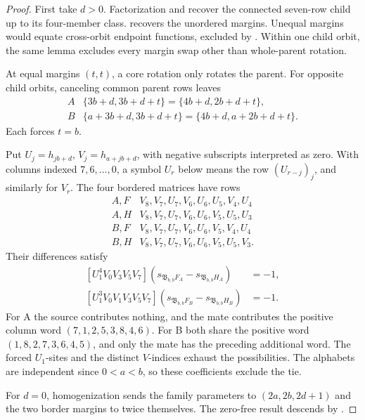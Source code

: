 \documentclass[11pt,a4paper]{amsart}
\numberwithin{equation}{section}
\theoremstyle{plain}
\theoremstyle{definition}
\newcommand{\B}{\mathfrak B}
\begin{document}
\begin{proof}
First take \(d>0\).  Factorization and 
recover the connected seven-row child up to its four-member class.
 recovers the unordered margins.  Unequal margins
would equate cross-orbit endpoint functions, excluded by
.  Within one child orbit, the same
lemma excludes every margin swap other than whole-parent rotation.

At equal margins \((t,t)\), a core rotation only rotates the parent.
For opposite child orbits, canceling common parent rows leaves
\begin{equation}\label{eq:ten-negative-border-rows}
 \begin{array}{c|c}
 A&\{3b+d,3b+d+t\}=\{4b+d,2b+d+t\},\\
 B&\{a+3b+d,3b+d+t\}=\{4b+d,a+2b+d+t\}.
 \end{array}
\end{equation}
Each forces \(t=b\).

Put \(U_j=h_{jb+d}\), \(V_j=h_{a+jb+d}\), with negative
subscripts interpreted as zero.  With columns indexed \(7,6,\ldots,0\),
a symbol \(U_r\) below means the row \((U_{r-j})_j\), and similarly
for \(V_r\).  The four bordered matrices have rows
\begin{equation}\label{eq:ten-negative-border-matrices}
 \begin{array}{c|l}
 A,F&V_8,V_7,U_7,V_6,U_6,U_5,V_4,U_4\\
 A,H&V_8,V_7,U_7,V_6,U_6,V_5,U_5,U_3\\
 B,F&V_8,V_7,U_7,V_6,U_6,V_5,V_4,U_4\\
 B,H&V_8,V_7,U_7,V_6,U_6,V_5,U_5,V_3.
 \end{array}
\end{equation}
Their differences satisfy
\begin{equation}\label{eq:ten-negative-border-separators}
 \begin{aligned}
 [U_1^4V_0V_3V_5V_7]
 (s_{\B_{b,b}F_A}-s_{\B_{b,b}H_A})&=-1,\\
 [U_1^3V_0V_1V_3V_5V_7]
 (s_{\B_{b,b}F_B}-s_{\B_{b,b}H_B})&=-1.
 \end{aligned}
\end{equation}
For A the source contributes nothing, and the mate contributes the
positive column word \((7,1,2,5,3,8,4,6)\).
For B both share the positive word \((1,8,2,7,3,6,4,5)\), and only
the mate has the preceding additional word.  The forced \(U_1\)-sites
and the distinct \(V\)-indices exhaust the possibilities.
The alphabets are independent since \(0<a<b\), so these coefficients
exclude the tie.

For \(d=0\), homogenization sends the family parameters to
\((2a,2b,2d+1)\) and the two border margins to twice themselves.
The zero-free result descends by .
\end{proof}
\end{document}

